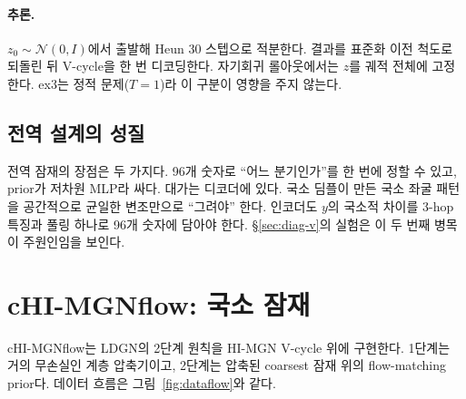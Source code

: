 \documentclass[11pt]{article}
\newcommand{\N}{\mathcal{N}}
\begin{document}
\paragraph{추론.} $z_0\sim\N(0,I)$에서 출발해 Heun 30 스텝으로 적분한다. 결과를
표준화 이전 척도로 되돌린 뒤 V-cycle을 한 번 디코딩한다. 자기회귀 롤아웃에서는
$z$를 궤적 전체에 고정한다. ex3는 정적 문제($T=1$)라 이 구분이 영향을 주지
않는다.

\subsection{전역 설계의 성질}
전역 잠재의 장점은 두 가지다. 96개 숫자로 ``어느 분기인가''를 한 번에 정할
수 있고, prior가 저차원 MLP라 싸다. 대가는 디코더에 있다. 국소 딤플이 만든
국소 좌굴 패턴을 공간적으로 균일한 변조만으로 ``그려야'' 한다. 인코더도
$y$의 국소적 차이를 3-hop 특징과 풀링 하나로 96개 숫자에 담아야 한다.
\S\ref{sec:diag-v}의 실험은 이 두 번째 병목이 주원인임을 보인다.

\section{cHI-MGNflow: 국소 잠재}\label{sec:chi}

cHI-MGNflow는 LDGN의 2단계 원칙을 HI-MGN V-cycle 위에 구현한다. 1단계는
거의 무손실인 계층 압축기이고, 2단계는 압축된 coarsest 잠재 위의
flow-matching prior다. 데이터 흐름은 그림~\ref{fig:dataflow}와 같다.
\end{document}
